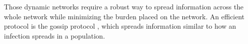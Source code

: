 \documentclass[12pt,journal]{IEEEtran}
\begin{document}

Those dynamic networks require a robust way to spread information across the whole network while minimizing the burden placed on the network. An efficient protocol is the gossip protocol \cite{gossip}, which spreads information similar to how an infection spreads in a population.






%
%

\end{document}
